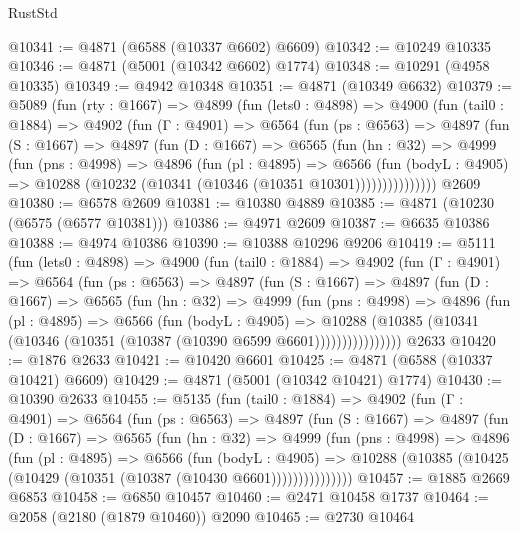 \begin{lexlean}{RustStd}
\begin{coremodule}
@10341 := @4871 (@6588 (@10337 @6602) @6609)
@10342 := @10249 @10335
@10346 := @4871 (@5001 (@10342 @6602) @1774)
@10348 := @10291 (@4958 @10335)
@10349 := @4942 @10348
@10351 := @4871 (@10349 @6632)
@10379 := @5089
    (fun (rty : @1667) =>
    @4899
      (fun (lets0 : @4898) =>
      @4900
        (fun (tail0 : @1884) =>
        @4902
          (fun (Γ : @4901) =>
          @6564
            (fun (ps : @6563) =>
            @4897
              (fun (S : @1667) =>
              @4897
                (fun (D : @1667) =>
                @6565
                  (fun (hn : @32) =>
                  @4999
                    (fun (pns : @4998) =>
                    @4896
                      (fun (pl : @4895) =>
                      @6566
                        (fun (bodyL : @4905) =>
                        @10288 (@10232 (@10341 (@10346 (@10351 @10301)))))))))))))))
    @2609
@10380 := @6578 @2609
@10381 := @10380 @4889
@10385 := @4871 (@10230 (@6575 (@6577 @10381)))
@10386 := @4971 @2609
@10387 := @6635 @10386
@10388 := @4974 @10386
@10390 := @10388 @10296 @9206
@10419 := @5111
    (fun (lets0 : @4898) =>
    @4900
      (fun (tail0 : @1884) =>
      @4902
        (fun (Γ : @4901) =>
        @6564
          (fun (ps : @6563) =>
          @4897
            (fun (S : @1667) =>
            @4897
              (fun (D : @1667) =>
              @6565
                (fun (hn : @32) =>
                @4999
                  (fun (pns : @4998) =>
                  @4896
                    (fun (pl : @4895) =>
                    @6566
                      (fun (bodyL : @4905) =>
                      @10288
                        (@10385 (@10341 (@10346 (@10351 (@10387 (@10390 @6599 @6601))))))))))))))))
    @2633
@10420 := @1876 @2633
@10421 := @10420 @6601
@10425 := @4871 (@6588 (@10337 @10421) @6609)
@10429 := @4871 (@5001 (@10342 @10421) @1774)
@10430 := @10390 @2633
@10455 := @5135
    (fun (tail0 : @1884) =>
    @4902
      (fun (Γ : @4901) =>
      @6564
        (fun (ps : @6563) =>
        @4897
          (fun (S : @1667) =>
          @4897
            (fun (D : @1667) =>
            @6565
              (fun (hn : @32) =>
              @4999
                (fun (pns : @4998) =>
                @4896
                  (fun (pl : @4895) =>
                  @6566
                    (fun (bodyL : @4905) =>
                    @10288 (@10385 (@10425 (@10429 (@10351 (@10387 (@10430 @6601)))))))))))))))
@10457 := @1885 @2669 @6853
@10458 := @6850 @10457
@10460 := @2471 @10458 @1737
@10464 := @2058 (@2180 (@1879 @10460)) @2090
@10465 := @2730 @10464

\end{coremodule}
\end{lexlean}
